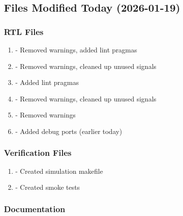 \subsection{Files Modified Today (2026-01-19)}\label{cr:fix:cpu-verification-ready:files-modified-today-2026-01-19}

\subsubsection{RTL Files}\label{cr:fix:cpu-verification-ready:rtl-files}

\begin{record}

\begin{enumerate}
\def\labelenumi{\arabic{enumi}.}
\tightlist
\item
   - Removed warnings, added lint
  pragmas
\item
   - Removed warnings, cleaned up unused
  signals
\item
   - Added lint pragmas
\item
   - Removed warnings, cleaned up unused
  signals
\item
   - Removed warnings
\item
   - Added debug ports (earlier
  today)
\end{enumerate}

\end{record}

\subsubsection{Verification Files}\label{cr:fix:cpu-verification-ready:verification-files}

\begin{record}

\begin{enumerate}
\def\labelenumi{\arabic{enumi}.}
\tightlist
\item
   - Created simulation makefile
\item
   - Created smoke tests
\end{enumerate}

\end{record}

\subsubsection{Documentation}\label{cr:fix:cpu-verification-ready:documentation}

